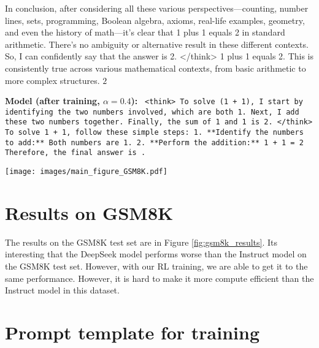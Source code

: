 {In conclusion, after considering all these various perspectives—counting, number lines, sets, programming, Boolean algebra, axioms, real-life examples, geometry, and even the history of math—it's clear that 1 plus 1 equals 2 in standard arithmetic. There's no ambiguity or alternative result in these different contexts. So, I can confidently say that the answer is 2.
</think>
1 plus 1 equals 2. This is consistently true across various mathematical contexts, from basic arithmetic to more complex structures. 
    $\boxed{2}$
}


\pagebreak
\textbf{Model (after training, $\alpha = 0.4$):} 
\texttt{
<think>
To solve (1 + 1), I start by identifying the two numbers involved, which are both 1. Next, I add these two numbers together. 
Finally, the sum of 1 and 1 is 2.
</think>
To solve 1 + 1, follow these simple steps:
1. **Identify the numbers to add:** Both numbers are 1.
2. **Perform the addition:**
   1 + 1 = 2  
Therefore, the final answer is .}

\begin{figure*}[h!]
\centering
  \texttt{[image: images/main\_figure\_GSM8K.pdf]}
  \caption{This figures describes the results of our training on the GSM8k test set where every prompt is evaluated once to compute the average pass rate. The green triangle in the top-left represents the desirable trend where higher accuracy is achieved with a lower number of tokens. Different colors for \emph{vLLM Cutoff} denote different cutoff values. Similarly for \emph{Ours} different colors denote different values of $\coeff$.}
  \label{fig:gsm8k_results}
\end{figure*}
\section{Results on GSM8K}
\label{sec:gsm_appendix}

The results on the GSM8K test set are in Figure \ref{fig:gsm8k_results}. Its interesting that the DeepSeek model performs worse than the Instruct model on the GSM8K test set. However, with our RL training, we are able to get it to the same performance. However, it is hard to make it more compute efficient than the Instruct model in this dataset. 

\section{Prompt template for training}
\label{sec:prompt_appendix}

